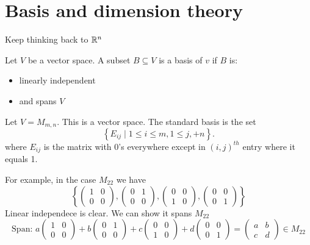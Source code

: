 
\section{Basis and dimension theory}
Keep thinking back to $\mathbb{R}^{n}$

\begin{definition}[Basis of V]
	Let $V$ be a vector space. A subset $B \subseteq V$ is a basis of $v$ if $B$ is:
	\begin{itemize}
		\item linearly independent 
		\item and spans $V$
	\end{itemize}
	\end{definition}

\begin{eg}
	Let $V= M_{m,n}$. This is a vector space. The standard basis is the set
	 \[
		 \left\{ E_{ij} \mid 1 \le i\le m, 1\le j,+n \right\} 
	.\] where $E_{ij}$ is the matrix with $0$'s everywhere except in $(i,j)^{th}$ entry where it equals 1.
	
	For example, in the case $M_{22}$ we have
	\[
		\left\{ \begin{pmatrix} 1 & 0 \\ 0 & 0 \end{pmatrix}, \begin{pmatrix} 0 & 1\\ 0 & 0 \end{pmatrix}, \begin{pmatrix} 0 &0 \\ 1 &0 \end{pmatrix}, \begin{pmatrix} 0 &0 \\ 0&1 \end{pmatrix}    \right\} 
	\] 
	Linear independece is clear. We can show it spans $M_{22}$ 
	\[
		\text{Span: } a\begin{pmatrix} 1 & 0\\ 0 & 0 \end{pmatrix} + b\begin{pmatrix} 0 & 1\\ 0 & 0 \end{pmatrix} + c\begin{pmatrix} 0 & 0\\ 1 & 0 \end{pmatrix} + d\begin{pmatrix} 0 & 0\\ 0 & 1 \end{pmatrix} = \begin{pmatrix} a &b \\ c&d \end{pmatrix} \in M_{22} 
	\] 
\end{eg}

